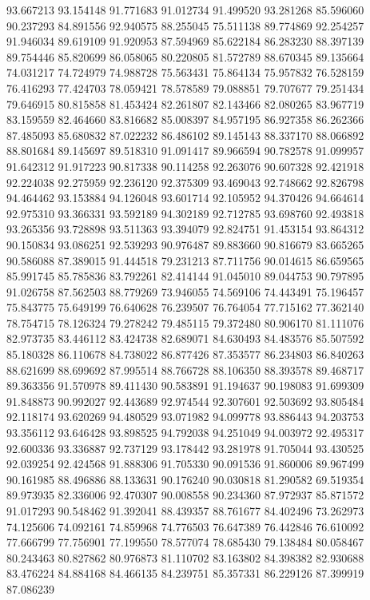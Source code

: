 93.667213
93.154148
91.771683
91.012734
91.499520
93.281268
85.596060
90.237293
84.891556
92.940575
88.255045
75.511138
89.774869
92.254257
91.946034
89.619109
91.920953
87.594969
85.622184
86.283230
88.397139
89.754446
85.820699
86.058065
80.220805
81.572789
88.670345
89.135664
74.031217
74.724979
74.988728
75.563431
75.864134
75.957832
76.528159
76.416293
77.424703
78.059421
78.578589
79.088851
79.707677
79.251434
79.646915
80.815858
81.453424
82.261807
82.143466
82.080265
83.967719
83.159559
82.464660
83.816682
85.008397
84.957195
86.927358
86.262366
87.485093
85.680832
87.022232
86.486102
89.145143
88.337170
88.066892
88.801684
89.145697
89.518310
91.091417
89.966594
90.782578
91.099957
91.642312
91.917223
90.817338
90.114258
92.263076
90.607328
92.421918
92.224038
92.275959
92.236120
92.375309
93.469043
92.748662
92.826798
94.464462
93.153884
94.126048
93.601714
92.105952
94.370426
94.664614
92.975310
93.366331
93.592189
94.302189
92.712785
93.698760
92.493818
93.265356
93.728898
93.511363
93.394079
92.824751
91.453154
93.864312
90.150834
93.086251
92.539293
90.976487
89.883660
90.816679
83.665265
90.586088
87.389015
91.444518
79.231213
87.711756
90.014615
86.659565
85.991745
85.785836
83.792261
82.414144
91.045010
89.044753
90.797895
91.026758
87.562503
88.779269
73.946055
74.569106
74.443491
75.196457
75.843775
75.649199
76.640628
76.239507
76.764054
77.715162
77.362140
78.754715
78.126324
79.278242
79.485115
79.372480
80.906170
81.111076
82.973735
83.446112
83.424738
82.689071
84.630493
84.483576
85.507592
85.180328
86.110678
84.738022
86.877426
87.353577
86.234803
86.840263
88.621699
88.699692
87.995514
88.766728
88.106350
88.393578
89.468717
89.363356
91.570978
89.411430
90.583891
91.194637
90.198083
91.699309
91.848873
90.992027
92.443689
92.974544
92.307601
92.503692
93.805484
92.118174
93.620269
94.480529
93.071982
94.099778
93.886443
94.203753
93.356112
93.646428
93.898525
94.792038
94.251049
94.003972
92.495317
92.600336
93.336887
92.737129
93.178442
93.281978
91.705044
93.430525
92.039254
92.424568
91.888306
91.705330
90.091536
91.860006
89.967499
90.161985
88.496886
88.133631
90.176240
90.030818
81.290582
69.519354
89.973935
82.336006
92.470307
90.008558
90.234360
87.972937
85.871572
91.017293
90.548462
91.392041
88.439357
88.761677
84.402496
73.262973
74.125606
74.092161
74.859968
74.776503
76.647389
76.442846
76.610092
77.666799
77.756901
77.199550
78.577074
78.685430
79.138484
80.058467
80.243463
80.827862
80.976873
81.110702
83.163802
84.398382
82.930688
83.476224
84.884168
84.466135
84.239751
85.357331
86.229126
87.399919
87.086239
